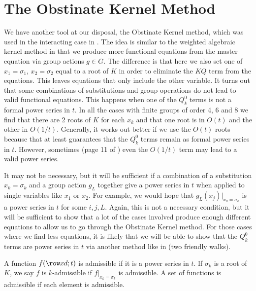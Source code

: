 
\chapter{The Obstinate Kernel Method}
\label{ch:OKM}

We have another tool at our disposal, the Obstinate Kernel method, which was used in the interacting case in \cite{tabbara2014exact}. The idea is similar to the weighted algebraic kernel method in that we produce more functional equations from the master equation via group actions $g \in G$. The difference is that here we also set one of $x_1 = \sigma_1$, $x_2 = \sigma_2$ equal to a root of $K$ in order to eliminate the $KQ$ term from the equations. This leaves equations that only include the other variable. It turns out that some combinations of substitutions and group operations do not lead to valid functional equations. This happens when one of the $Q_k^0$ terms is not a formal power series in $t$. In all the cases with finite groups of order 4, 6 and 8 we find that there are 2 roots of $K$ for each $x_k$ and that one root is in $O(t)$ and the other in $O(1/t)$. Generally, it works out better if we use the $O(t)$ roots because that at least guarantees that the $Q_k^0$ terms remain as formal power series in $t$. However, sometimes (page 11 of \cite{tabbara2014exact}) even the $O(1/t)$ term may lead to a valid power series. 

It may not be necessary, but it will be sufficient if a combination of a substitution $x_k = \sigma_k$ and a group action $g_L$ together give a power series in $t$ when applied to single variables like $x_1$ or $x_2$. For example, we would hope that $g_L(x_j)|_{x_k=\sigma_k}$ is a power series in $t$ for some $i,j,L$. Again, this is not a necessary condition, but it will be sufficient to show that a lot of the cases involved produce enough different equations to allow us to go through the Obstinate Kernel method. For those cases where we find less equations, it is likely that we will be able to show that the $Q_k^0$ terms are power series in $t$ via another method like in (two friendly walks).

\begin{definition} A function $f(\row xd;t)$ is admissible if it is a power series in $t$. If $\sigma_k$ is a root of $K$, we say $f$ is $k$-admissible if $f|_{x_k=\sigma_k}$ is admissible. A set of functions is admissible if each element is admissible.
\end{definition}


